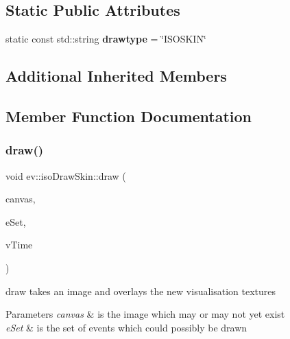 \subsection*{Static Public Attributes}
\begin{DoxyCompactItemize}
\item 
\mbox{\label{classev_1_1isoDrawSkin_a3e5828dce741f4b4d329159cecc11093}} 
static const std\+::string {\bfseries drawtype} = \char`\"{}I\+S\+O\+S\+K\+IN\char`\"{}
\end{DoxyCompactItemize}
\subsection*{Additional Inherited Members}


\subsection{Member Function Documentation}
\mbox{\label{classev_1_1isoDrawSkin_a2d4ed05b06bea443974f5b07a4d69374}} 
\subsubsection{\texorpdfstring{draw()}{draw()}}
{\footnotesize\ttfamily void ev\+::iso\+Draw\+Skin\+::draw (\begin{DoxyParamCaption}\item[{cv\+::\+Mat \&}]{canvas,  }\item[{const ev\+::v\+Queue \&}]{e\+Set,  }\item[{int}]{v\+Time }\end{DoxyParamCaption})\hspace{0.3cm}{\ttfamily [virtual]}}



draw takes an image and overlays the new visualisation textures 


\begin{DoxyParams}{Parameters}
{\em canvas} & is the image which may or may not yet exist \\
\hline
{\em e\+Set} & is the set of events which could possibly be drawn \\
\hline
\end{DoxyParams}



